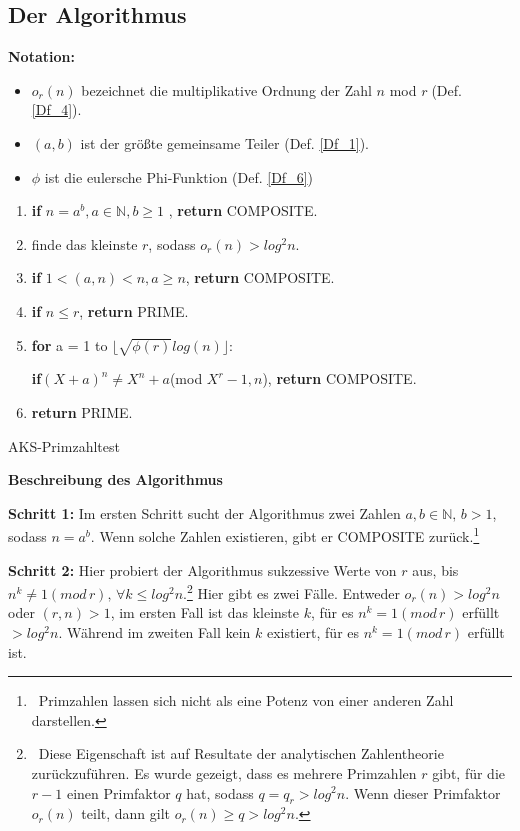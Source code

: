 \documentclass[12pt,oneside]{article}
\theoremstyle{remark}
\theoremstyle{definition}
\begin{document}
\subsection{Der Algorithmus}\label{algo}
\textbf{Notation:}
\begin{itemize}
    \item $o_r(n)$ bezeichnet die multiplikative Ordnung der Zahl $n$ mod $r \; $(Def. \ref{Df_4}).
    \item $(a,b)$ ist der größte gemeinsame Teiler (Def. \ref{Df_1}).
\item $\phi$ ist die eulersche Phi-Funktion (Def. \ref{Df_6})  
\end{itemize}
\begin{algorithm}[H]
\SetAlgoLined
{}

\begin{enumerate}
\item \textbf{if} $n = a^b, a \in \mathbb{N}, b \geq 1$ , \textbf{return} COMPOSITE.
\item  finde das kleinste $r$, sodass $o_{r}(n) > log^2 n $.
\item \textbf{if} $1 < (a,n) < n, a \geq n $, \textbf{return} COMPOSITE.
\item \textbf{if} $n \leq r $, \textbf{return} PRIME.
\item \textbf{for} a = 1 to $\lfloor \sqrt{\phi(r)}log(n) \rfloor$:

 \textbf{if}$(X + a)^n \neq X^n + a $(mod $X^r - 1, n$), \textbf{return} COMPOSITE.
 \item \textbf{return} PRIME.
\end{enumerate}
 
\caption{AKS-Primzahltest}
\end{algorithm}

\textbf{Beschreibung des Algorithmus}\newline

\textbf{Schritt 1: }Im ersten Schritt sucht der Algorithmus zwei Zahlen $a,b \in \mathbb{N}, \, b > 1$, sodass $n = a^b$. Wenn solche Zahlen existieren, gibt er COMPOSITE zurück.\footnote{$\,$ Primzahlen lassen sich nicht als eine Potenz von einer anderen Zahl darstellen.}  

\textbf{Schritt 2: }Hier probiert der Algorithmus sukzessive Werte von $r$ aus, bis $n^k \neq 1 (mod \, r), \, \forall k \leq log^2 n$.\footnote{$\,$ Diese Eigenschaft ist auf Resultate  der analytischen Zahlentheorie zurückzuführen. Es wurde gezeigt, dass es mehrere Primzahlen $r$ gibt, für die $r - 1$ einen Primfaktor $q$ hat, sodass $q = q_r > log^2n$. Wenn dieser Primfaktor $o_r(n)$ teilt, dann gilt $o_r(n) \geq q  > log^2 n$\cite{and-gar}.} Hier gibt es zwei Fälle. Entweder $o_r(n) > log^2 n$ oder $(r,n) > 1$, im ersten Fall ist das kleinste $k$, für es $n^k =  1 (mod \, r)$ erfüllt $ > log^2n$. Während im zweiten Fall kein $k$ existiert, für es $n^k = 1 (mod \, r)$ erfüllt ist.  
\end{document}
